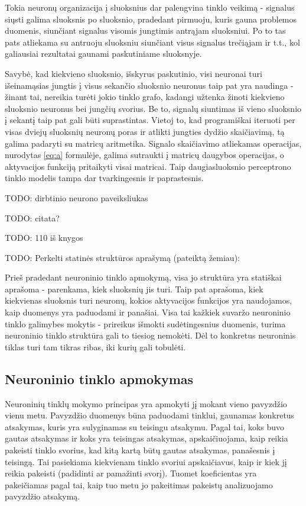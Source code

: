 \documentclass{VUMIFPSbakalaurinis}
\newcommand{\TODO}[1]{
\colorbox{todo-background-color}{TODO: #1}
}
\begin{document}
Tokia neuronų organizacija į sluoksnius dar palengvina tinklo veikimą - signalus siųsti galima sluoksnis po sluoksnio, pradedant pirmuoju, kuris gauna problemos duomenis, siunčiant signalus visomis jungtimis antrąjam sluoksniui.
Po to tas pats atliekama su antruoju sluoksniu siunčiant visus signalus trečiąjam ir t.t., kol galiausiai rezultatai gaunami paskutiniame sluoksnyje.

Savybė, kad kiekvieno sluoksnio, išskyrus paskutinio, visi neuronai turi išeinamąsias jungtis į visus sekančio sluoksnio neuronus taip pat yra naudinga - žinant tai, nereikia turėti jokio tinklo grafo, kadangi užtenka žinoti kiekvieno sluoksnio neuronus bei jungčių svorius.
Be to, signalų siuntimas iš vieno sluoksnio į sekantį taip pat gali būti suprastintas.
Vietoj to, kad programiškai iteruoti per visas dviejų sluoksnių neuronų poras ir atlikti jungties dydžio skaičiavimą, tą galima padaryti su matricų aritmetika.
Signalo skaičiavimo atliekamas operacijas, nurodytas \ref{eq:a} formulėje, galima sutraukti į matricų daugybos operacijas, o aktyvacijos funkciją pritaikyti visai matricai.
Taip daugiasluoksnio perceptrono tinklo modelis tampa dar tvarkingesnis ir paprastesnis.


\TODO{dirbtinio neurono paveiksliukas}


\TODO{citata?}


\TODO{110 iš knygos}


\TODO{Perkelti statinės struktūros aprašymą (pateiktą žemiau):}

Prieš pradedant neuroninio tinklo apmokymą, visa jo struktūra yra statiškai aprašoma - parenkama, kiek sluoksnių jis turi.
Taip pat aprašoma, kiek kiekvienas sluoksnis turi neuronų, kokios aktyvacijos funkcijos yra naudojamos, kaip duomenys yra paduodami ir panašiai.
Visa tai kažkiek suvaržo neuroninio tinklo galimybes mokytis - prireikus išmokti sudėtingesnius duomenis, turima neuroninio tinklo struktūra gali to tiesiog nemokėti.
Dėl to konkretus neuroninis tiklas turi tam tikras ribas, iki kurių gali tobulėti.

\subsection{Neuroninio tinklo apmokymas} \label{network-learning}

Neuroninių tinklų mokymo principas yra apmokyti jį mokant vieno pavyzdžio vienu metu.
Pavyzdžio duomenys būna paduodami tinklui, gaunamas konkretus atsakymas, kuris yra sulyginamas su teisingu atsakymu.
Pagal tai, koks buvo gautas atsakymas ir koks yra teisingas atsakymas, apskaičiuojama, kaip reikia pakeisti tinklo svorius, kad kitą kartą būtų gautas atsakymas, panašesnis į teisingą.
Tai pasiekiama kiekvienam tinklo svoriui apskaičiavus, kaip ir kiek jį reikia pakeisti (padidinti ar pamažinti svorį).
Tuomet koeficientas yra pakeičiamas pagal tai, kaip tuo metu jo pakeitimas pakeistų analizuojamo pavyzdžio atsakymą.
\end{document}
